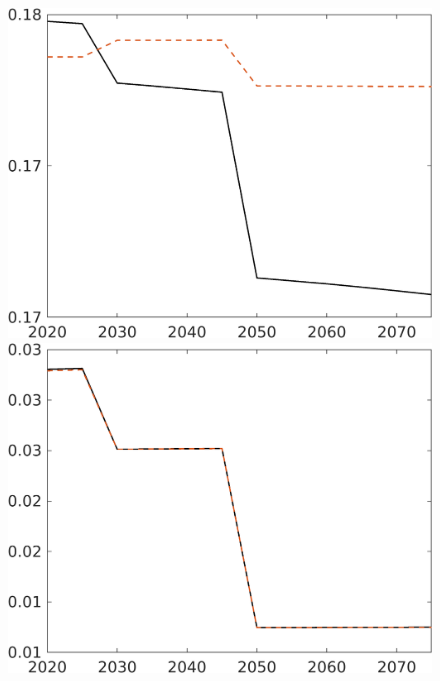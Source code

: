 \begin{figure}[h!!]
\begin{minipage}[]{0.32\textwidth}
	\end{minipage}
	\begin{minipage}[]{0.32\textwidth}
		\includegraphics[width=1\textwidth]{../../codding_model/own_basedOnFried/optimalPol_elastS_DisuSci/figures/all_1705/comp_notaul_OPT_T_NoTaus_Ln_spillover0_sep1_BN0_ineq0_etaa0.79.png}
	\end{minipage}
	\begin{minipage}[]{0.32\textwidth}
		\includegraphics[width=1\textwidth]{../../codding_model/own_basedOnFried/optimalPol_elastS_DisuSci/figures/all_1705/comp_notaul_OPT_T_NoTaus_sff_spillover0_sep1_BN0_ineq0_etaa0.79.png}

\end{minipage}
\end{figure}
